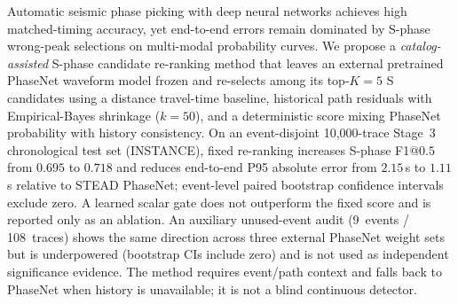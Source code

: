 Automatic seismic phase picking with deep neural networks achieves high
matched-timing accuracy, yet end-to-end errors remain dominated by
S-phase wrong-peak selections on multi-modal probability curves.
We propose a \emph{catalog-assisted} S-phase candidate re-ranking method that
leaves an external pretrained PhaseNet waveform model frozen and re-selects
among its top-$K{=}5$ S candidates using a distance travel-time baseline,
historical path residuals with Empirical-Bayes shrinkage ($k{=}50$), and a
deterministic score mixing PhaseNet probability with history consistency.
On an event-disjoint 10{,}000-trace Stage~3 chronological test set (INSTANCE),
fixed re-ranking increases S-phase F1@$0.5$ from $0.695$ to $0.718$ and reduces
end-to-end P95 absolute error from $2.15$\,s to $1.11$\,s relative to STEAD
PhaseNet; event-level paired bootstrap confidence intervals exclude zero.
A learned scalar gate does not outperform the fixed score and is reported only
as an ablation.
An auxiliary unused-event audit (9~events / 108~traces) shows the same
direction across three external PhaseNet weight sets but is underpowered
(bootstrap CIs include zero) and is not used as independent significance
evidence.
The method requires event/path context and falls back to PhaseNet when history
is unavailable; it is not a blind continuous detector.
